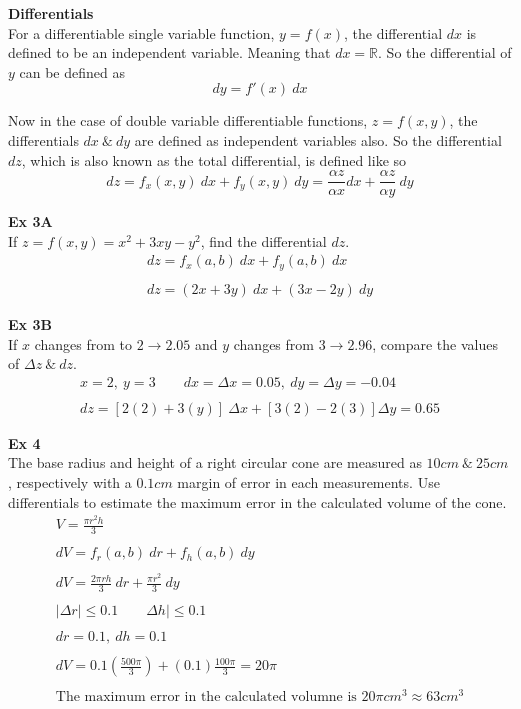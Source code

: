 \documentclass{article}
\begin{document}
  \textbf{Differentials}\\
  For a differentiable single variable function, $ y=f(x) $, the differential $ dx $ is defined to be an independent variable. Meaning that $ dx = \mathbb{R}$. So the differential of $ y $ can be defined as
  \[
    dy=f'(x)~dx
  \]
  
  Now in the case of double variable differentiable functions, $ z=f(x,y) $, the differentials $ dx ~\&~ dy $ are defined as independent variables also. So the differential $ dz $, which is also known as the total differential, is defined like so
  \[
    dz=f_{x}(x,y)~dx+f_{y}(x,y)~dy=\frac{\alpha z}{\alpha x}dx+\frac{\alpha z}{\alpha y}~dy   
  \]

  \textbf{Ex 3A}\\
  If $ z=f(x,y)=x^{2}+3xy-y^{2}$, find the differential $ dz $.
  \[
    \begin{gathered}
      dz=f_{x}(a,b)~dx+f_{y}(a,b)~dx\\
      ~\\
      \boxed{dz=(2x+3y)~dx+(3x-2y)~dy}
    \end{gathered}
  \]

  \textbf{Ex 3B}\\
  If $ x $ changes from to $ 2 \to 2.05$ and $ y $ changes from $ 3\to 2.96 $, compare the values of $ \Delta z  ~\&~ dz$.
  \[
    \begin{gathered}
    x=2,~y=3 \qquad dx=\Delta x =0.05,~dy=\Delta y =-0.04\\
    ~\\
    dz=[2(2)+3(y)]~\Delta x + [3(2)-2(3)]\Delta y=\boxed{0.65}
    \end{gathered}
  \]

  \textbf{Ex 4}\\
  The base radius and height of a right circular cone are measured as $ 10cm ~\&~ 25cm $, respectively with a $ 0.1cm$ margin of error in each measurements. Use differentials to estimate the maximum error in the calculated volume of the cone.
  \[
    \begin{gathered}
    V=\frac{\pi r^{2} h}{3}\\
    ~\\
    dV=f_{r}(a,b)~dr+f_{h}(a,b)~dy\\
    ~\\
    dV=\frac{2\pi rh}{3}~dr+\frac{\pi r^{2} }{3}~dy\\
    ~\\
    | \Delta r | \le 0.1 \qquad \Delta h | \le 0.1\\
    ~\\
    dr=0.1,~dh=0.1\\
    ~\\
    dV=0.1(\frac{500\pi}{3}) +(0.1)\frac{100\pi}{3}=\boxed{20\pi}\\
    ~\\
    \text{The maximum error in the calculated volumne is } 20\pi cm^{3} \approx 63 cm^{3} 
    \end{gathered}
  \]
\end{document}
